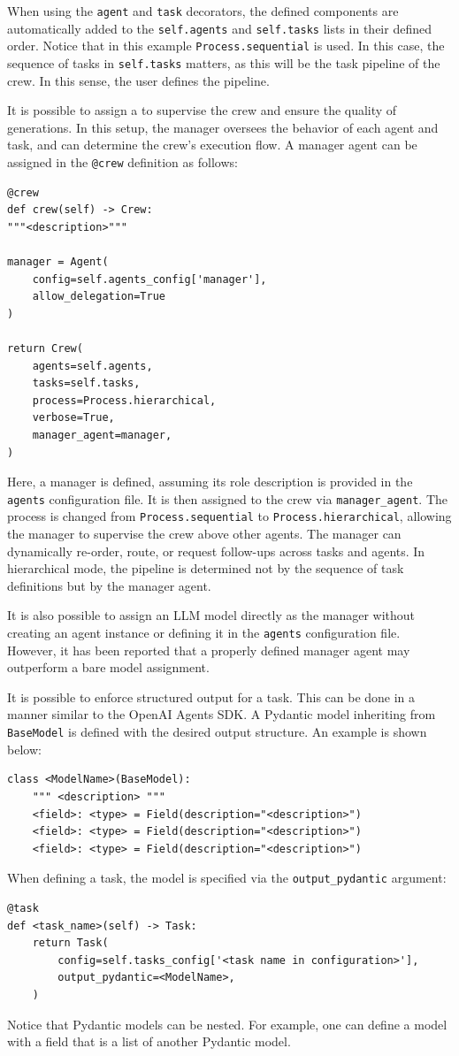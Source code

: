 When using the \verb|agent| and \verb|task| decorators, the defined components are automatically added to the \verb|self.agents| and \verb|self.tasks| lists in their defined order. Notice that in this example \verb|Process.sequential| is used. In this case, the sequence of tasks in \verb|self.tasks| matters, as this will be the task pipeline of the crew. In this sense, the user defines the pipeline.

It is possible to assign a  to supervise the crew and ensure the quality of generations. In this setup, the manager oversees the behavior of each agent and task, and can determine the crew’s execution flow. A manager agent can be assigned in the \verb|@crew| definition as follows:
\begin{lstlisting}
@crew
def crew(self) -> Crew:
"""<description>"""

manager = Agent(
    config=self.agents_config['manager'],
    allow_delegation=True
)

return Crew(
    agents=self.agents,
    tasks=self.tasks,
    process=Process.hierarchical,
    verbose=True,
    manager_agent=manager,
)
\end{lstlisting}

Here, a manager is defined, assuming its role description is provided in the \verb|agents| configuration file. It is then assigned to the crew via \verb|manager_agent|. The process is changed from \verb|Process.sequential| to \verb|Process.hierarchical|, allowing the manager to supervise the crew above other agents. The manager can dynamically re-order, route, or request follow-ups across tasks and agents. In hierarchical mode, the pipeline is determined not by the sequence of task definitions but by the manager agent.

It is also possible to assign an LLM model directly as the manager without creating an agent instance or defining it in the \verb|agents| configuration file. However, it has been reported that a properly defined manager agent may outperform a bare model assignment.

It is possible to enforce structured output for a task. This can be done in a manner similar to the OpenAI Agents SDK. A Pydantic model inheriting from \verb|BaseModel| is defined with the desired output structure. An example is shown below:
\begin{lstlisting}
class <ModelName>(BaseModel):
    """ <description> """
    <field>: <type> = Field(description="<description>")
    <field>: <type> = Field(description="<description>")
    <field>: <type> = Field(description="<description>")
\end{lstlisting}
When defining a task, the model is specified via the \verb|output_pydantic| argument:
\begin{lstlisting}
@task
def <task_name>(self) -> Task:
    return Task(
        config=self.tasks_config['<task name in configuration>'],
        output_pydantic=<ModelName>,
    )
\end{lstlisting}
Notice that Pydantic models can be nested. For example, one can define a model with a field that is a list of another Pydantic model.

